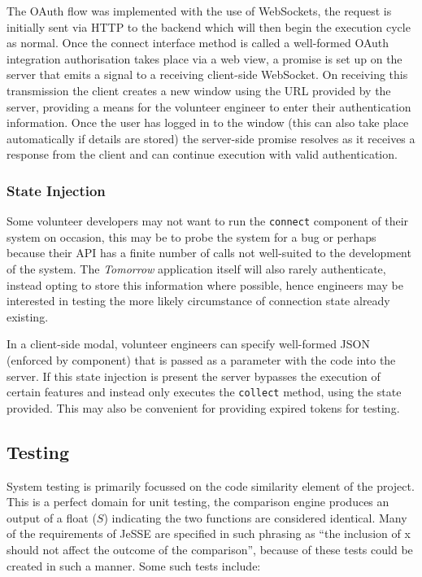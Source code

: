 \documentclass[jou,apacite]{apa6}
\begin{document}
The OAuth flow was implemented with the use of WebSockets, the request is initially sent via HTTP to the backend which will then begin the execution cycle as normal. Once the connect interface method is called a well-formed OAuth integration authorisation takes place via a web view,  a promise is set up on the server that emits a signal to a receiving client-side WebSocket. On receiving this transmission the client creates a new window using the URL provided by the server, providing a means for the volunteer engineer to enter their authentication information. Once the user has logged in to the window (this can also take place automatically if details are stored) the server-side promise resolves as it receives a response from the client and can continue execution with valid authentication.

\subsubsection{State Injection}
Some volunteer developers may not want to run the \texttt{connect} component of their system on occasion, this may be to probe the system for a bug or perhaps because their API has a finite number of calls not well-suited to the development of the system. The \textit{Tomorrow} application itself will also rarely authenticate, instead opting to store this information where possible, hence engineers may be interested in testing the more likely circumstance of connection state already existing. 

In a client-side modal, volunteer engineers can specify well-formed JSON (enforced by component) that is passed as a parameter with the code into the server. If this state injection is present the server bypasses the execution of certain features and instead only executes the \texttt{collect} method, using the state provided. This may also be convenient for providing expired tokens for testing.

\subsection{Testing}
System testing is primarily focussed on the code similarity element of the project. This is a perfect domain for unit testing, the comparison engine produces an output of a float ($S$) indicating the two functions are considered identical. Many of the requirements of JeSSE are specified in such phrasing as “the inclusion of x should not affect the outcome of the comparison”, because of these tests could be created in such a manner. Some such tests include:
\end{document}

